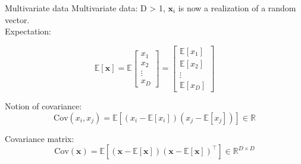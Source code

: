 \documentclass{beamer}
\begin{document}
\begin{frame}{Multivariate data}
Multivariate data: D > 1, $\mathbf{x}_{i}$ is now a realization of a random vector.\\

\vspace{0.2cm}
Expectation:

\begin{equation*}
\mathbb{E}[\mathbf{x}] = \mathbb{E} \begin{bmatrix}
x_1\\
x_2\\
\vdots\\
x_D \end{bmatrix} =  \begin{bmatrix}
\mathbb{E}[x_1]\\
\mathbb{E}[x_2]\\
\vdots\\
\mathbb{E}[x_D] \end{bmatrix}
\end{equation*}



Notion of covariance:\\
\begin{equation*}
\textrm{Cov}(x_i,x_j) = \mathbb{E}[(x_i - \mathbb{E}[x_i])
(x_j - \mathbb{E}[x_j]) ] \in \mathbb{R}
\end{equation*}

Covariance matrix:\\

\begin{equation*}
\textrm{Cov}(\mathbf{x}) = \mathbb{E}[(\mathbf{x}- \mathbb{E}[\mathbf{x}])(\mathbf{x}- \mathbb{E}[\mathbf{x}])^{\top}] \in \mathbb{R}^{D\times D}
\end{equation*}

\end{frame}
\end{document}
